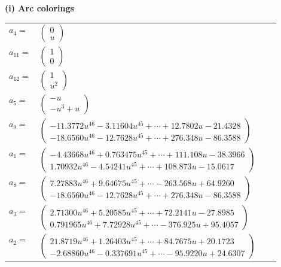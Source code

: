 \documentclass[1p]{elsarticle_modified}
\theoremstyle{definition}
\begin{document}
\flushleft \textbf{(i) Arc colorings}\\
\begin{tabular}{m{7pt} m{180pt} m{7pt} m{180pt} }
\flushright $a_{4}=$&$\begin{pmatrix}0\\u\end{pmatrix}$ \\
\flushright $a_{11}=$&$\begin{pmatrix}1\\0\end{pmatrix}$ \\
\flushright $a_{12}=$&$\begin{pmatrix}1\\u^2\end{pmatrix}$ \\
\flushright $a_{5}=$&$\begin{pmatrix}- u\\- u^3+u\end{pmatrix}$ \\
\flushright $a_{9}=$&$\begin{pmatrix}-11.3772 u^{46}-3.11604 u^{45}+\cdots+12.7802 u-21.4328\\-18.6560 u^{46}-12.7628 u^{45}+\cdots+276.348 u-86.3588\end{pmatrix}$ \\
\flushright $a_{1}=$&$\begin{pmatrix}-4.43668 u^{46}+0.763475 u^{45}+\cdots+111.108 u-38.3966\\1.70932 u^{46}-4.54241 u^{45}+\cdots+108.873 u-15.0617\end{pmatrix}$ \\
\flushright $a_{8}=$&$\begin{pmatrix}7.27883 u^{46}+9.64675 u^{45}+\cdots-263.568 u+64.9260\\-18.6560 u^{46}-12.7628 u^{45}+\cdots+276.348 u-86.3588\end{pmatrix}$ \\
\flushright $a_{3}=$&$\begin{pmatrix}2.71300 u^{46}+5.20585 u^{45}+\cdots+72.2141 u-27.8985\\0.791965 u^{46}+7.72928 u^{45}+\cdots-376.925 u+95.4057\end{pmatrix}$ \\
\flushright $a_{2}=$&$\begin{pmatrix}21.8719 u^{46}+1.26403 u^{45}+\cdots+84.7675 u+20.1723\\-2.68860 u^{46}-0.337691 u^{45}+\cdots-95.9220 u+24.6307\end{pmatrix}$ \\

\end{tabular}
\end{document}
